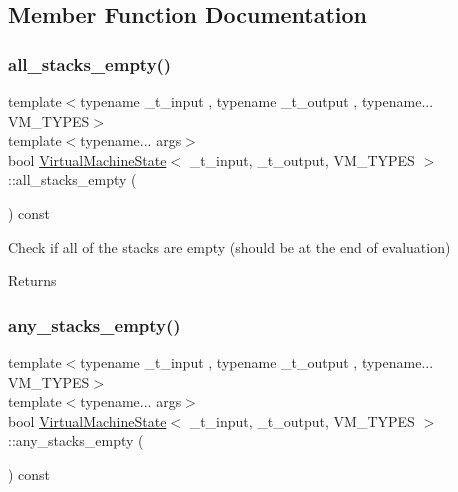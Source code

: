 \subsection{Member Function Documentation}
\mbox{\label{class_virtual_machine_state_a898acaa81e6385a26100847ab7232213}} 
\subsubsection{\texorpdfstring{all\+\_\+stacks\+\_\+empty()}{all\_stacks\_empty()}}
{\footnotesize\ttfamily template$<$typename \+\_\+t\+\_\+input , typename \+\_\+t\+\_\+output , typename... V\+M\+\_\+\+T\+Y\+P\+ES$>$ \\
template$<$typename... args$>$ \\
bool \hyperlink{class_virtual_machine_state}{Virtual\+Machine\+State}$<$ \+\_\+t\+\_\+input, \+\_\+t\+\_\+output, V\+M\+\_\+\+T\+Y\+P\+ES $>$\+::all\+\_\+stacks\+\_\+empty (\begin{DoxyParamCaption}{ }\end{DoxyParamCaption}) const\hspace{0.3cm}{\ttfamily [inline]}}

Check if all of the stacks are empty (should be at the end of evaluation) \begin{DoxyReturn}{Returns}

\end{DoxyReturn}
\mbox{\label{class_virtual_machine_state_a278567110ec6538566a8f6ed50bdd423}} 
\subsubsection{\texorpdfstring{any\+\_\+stacks\+\_\+empty()}{any\_stacks\_empty()}}
{\footnotesize\ttfamily template$<$typename \+\_\+t\+\_\+input , typename \+\_\+t\+\_\+output , typename... V\+M\+\_\+\+T\+Y\+P\+ES$>$ \\
template$<$typename... args$>$ \\
bool \hyperlink{class_virtual_machine_state}{Virtual\+Machine\+State}$<$ \+\_\+t\+\_\+input, \+\_\+t\+\_\+output, V\+M\+\_\+\+T\+Y\+P\+ES $>$\+::any\+\_\+stacks\+\_\+empty (\begin{DoxyParamCaption}{ }\end{DoxyParamCaption}) const\hspace{0.3cm}{\ttfamily [inline]}}

